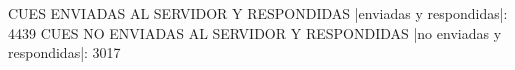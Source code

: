 CUES ENVIADAS AL SERVIDOR Y RESPONDIDAS
|enviadas y respondidas|: 4439
CUES NO ENVIADAS AL SERVIDOR Y RESPONDIDAS
|no enviadas y respondidas|: 3017